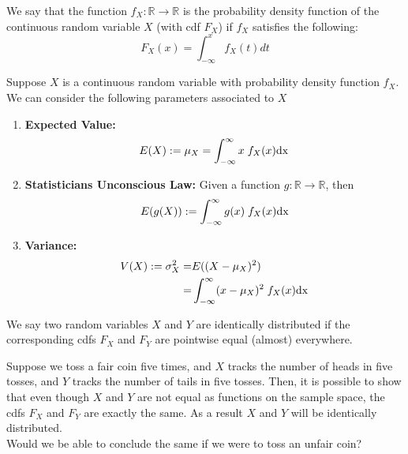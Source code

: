 \begin{defn}
    We say that the function $f_X: \mathbb{R}\longrightarrow \mathbb{R}$ is the probability density function of the continuous random variable $X$ (with cdf $F_X$) if $f_X$ satisfies the following:
    $$ F_X(x) = \int_{-\infty}^x f_X(t) dt$$
\end{defn}

\begin{defn}
    Suppose $X$ is a continuous random variable with probability density function $f_X$. We can consider the following parameters associated to $X$
\begin{enumerate}
    \item \textbf{Expected Value:}
    $$E(X) := \mu_X = \int_{-\infty}^\infty x\; f_X(x)\rm{dx}$$
    \item \textbf{Statisticians Unconscious Law:} Given a function $g: \mathbb{R} \longrightarrow \mathbb{R}$, then 
    $$E(g(X))  := \int_{-\infty}^\infty g(x)\; f_X(x)\rm{dx}$$
    \item \textbf{Variance:}
    \begin{eqnarray*}
        V(X) := \sigma^2_X =& E ((X-\mu_X)^2)\\
        =& \int_{-\infty}^\infty (x-\mu_X)^2\; f_X(x)\rm{dx}
    \end{eqnarray*}
\end{enumerate}
\end{defn}


\begin{defn}
    We say two random variables $X$ and $Y$ are identically distributed if the corresponding cdfs $F_X$ and $F_Y$ are pointwise equal (almost) everywhere. 
\end{defn}

\begin{ex}
    Suppose we toss a fair coin five times, and $X$ tracks the number of heads in five tosses, and $Y$ tracks the number of tails in five tosses. Then, it is possible to show that even though $X$ and $Y$ are not equal as functions on the sample space, the cdfs $F_X$ and $F_Y$ are exactly the same. As a result $X$ and $Y$ will be identically distributed. 
    \\

    Would we be able to conclude the same if we were to toss an unfair coin?
\end{ex}
